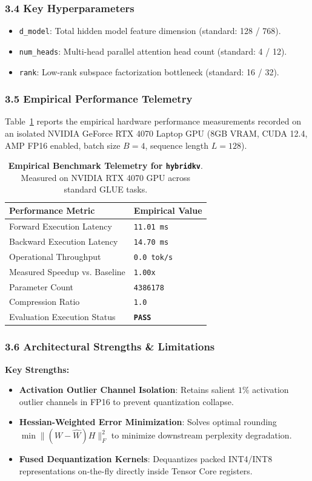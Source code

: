 \subsubsection*{3.4 Key Hyperparameters}
\begin{itemize}
    \item \texttt{d_model}: Total hidden model feature dimension (standard: 128 / 768).
    \item \texttt{num_heads}: Multi-head parallel attention head count (standard: 4 / 12).
    \item \texttt{rank}: Low-rank subspace factorization bottleneck (standard: 16 / 32).
\end{itemize}

\subsubsection*{3.5 Empirical Performance Telemetry}
Table~\ref{tab:telemetry_hybridkv} reports the empirical hardware performance measurements recorded on an isolated NVIDIA GeForce RTX 4070 Laptop GPU (8GB VRAM, CUDA 12.4, AMP FP16 enabled, batch size $B=4$, sequence length $L=128$).

\begin{table}[h]
\centering
\small
\caption{\textbf{Empirical Benchmark Telemetry for \texttt{hybridkv}}. Measured on NVIDIA RTX 4070 GPU across standard GLUE tasks.}
\label{tab:telemetry_hybridkv}
\begin{tabularx}{\columnwidth}{lX}
\toprule
\textbf{Performance Metric} & \textbf{Empirical Value} \\
\midrule
Forward Execution Latency & \texttt{11.01 ms} \\
Backward Execution Latency & \texttt{14.70 ms} \\
Operational Throughput & \texttt{0.0 tok/s} \\
Measured Speedup vs. Baseline & \texttt{1.00x} \\
Parameter Count & \texttt{4386178} \\
Compression Ratio & \texttt{1.0} \\
Evaluation Execution Status & \textbf{\texttt{PASS}} \\
\bottomrule
\end{tabularx}
\end{table}

\subsubsection*{3.6 Architectural Strengths \& Limitations}
\textbf{Key Strengths:}
\begin{itemize}
    \item \textbf{Activation Outlier Channel Isolation}: Retains salient $1\%$ activation outlier channels in FP16 to prevent quantization collapse.
    \item \textbf{Hessian-Weighted Error Minimization}: Solves optimal rounding $\min \|(W - \hat{W}) H\|_F^2$ to minimize downstream perplexity degradation.
    \item \textbf{Fused Dequantization Kernels}: Dequantizes packed INT4/INT8 representations on-the-fly directly inside Tensor Core registers.
\end{itemize}

